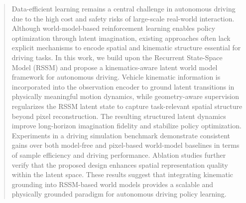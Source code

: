 \documentclass[letterpaper, 10 pt, conference]{ieeeconf}  %
\begin{document}
\begin{abstract}
Data-efficient learning remains a central challenge in autonomous driving due to the high cost and safety risks of large-scale real-world interaction. Although world-model-based reinforcement learning enables policy optimization through latent imagination, existing approaches often lack explicit mechanisms to encode spatial and kinematic structure essential for driving tasks.
In this work, we build upon the Recurrent State-Space Model (RSSM) and propose a kinematics-aware latent world model framework for autonomous driving. Vehicle kinematic information is incorporated into the observation encoder to ground latent transitions in physically meaningful motion dynamics, while geometry-aware supervision regularizes the RSSM latent state to capture task-relevant spatial structure beyond pixel reconstruction. The resulting structured latent dynamics improve long-horizon imagination fidelity and stabilize policy optimization.
Experiments in a driving simulation benchmark demonstrate consistent gains over both model-free and pixel-based world-model baselines in terms of sample efficiency and driving performance. Ablation studies further verify that the proposed design enhances spatial representation quality within the latent space. These results suggest that integrating kinematic grounding into RSSM-based world models provides a scalable and physically grounded paradigm for autonomous driving policy learning.

\end{abstract}










\end{document}
